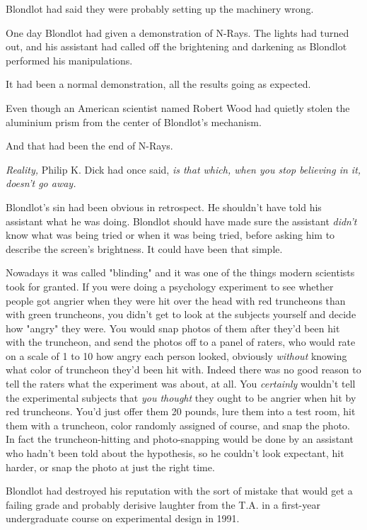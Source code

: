 Blondlot had said they were probably setting up the machinery wrong.

One day Blondlot had given a demonstration of N-Rays. The lights had turned
out, and his assistant had called off the brightening and darkening as Blondlot
performed his manipulations.

It had been a normal demonstration, all the results going as expected.

Even though an American scientist named Robert Wood had quietly stolen the
aluminium prism from the center of Blondlot's mechanism.

And that had been the end of N-Rays.

\emph{Reality,} Philip K. Dick had once said, \emph{is that which, when you
stop believing in it, doesn't go away.}

Blondlot's sin had been obvious in retrospect. He shouldn't have told his
assistant what he was doing. Blondlot should have made sure the assistant
\emph{didn't} know what was being tried or when it was being tried, before
asking him to describe the screen's brightness. It could have been that simple.

Nowadays it was called "blinding" and it was one of the things modern
scientists took for granted. If you were doing a psychology experiment to see
whether people got angrier when they were hit over the head with red truncheons
than with green truncheons, you didn't get to look at the subjects yourself and
decide how "angry" they were. You would snap photos of them after they'd been
hit with the truncheon, and send the photos off to a panel of raters, who would
rate on a scale of 1 to 10 how angry each person looked, obviously
\emph{without} knowing what color of truncheon they'd been hit with. Indeed
there was no good reason to tell the raters what the experiment was about, at
all. You \emph{certainly} wouldn't tell the experimental subjects that
\emph{you thought} they ought to be angrier when hit by red truncheons. You'd
just offer them 20 pounds, lure them into a test room, hit them with a
truncheon, color randomly assigned of course, and snap the photo. In fact the
truncheon-hitting and photo-snapping would be done by an assistant who hadn't
been told about the hypothesis, so he couldn't look expectant, hit harder, or
snap the photo at just the right time.

Blondlot had destroyed his reputation with the sort of mistake that would get a
failing grade and probably derisive laughter from the T.A. in a first-year
undergraduate course on experimental design{\el} in 1991.

